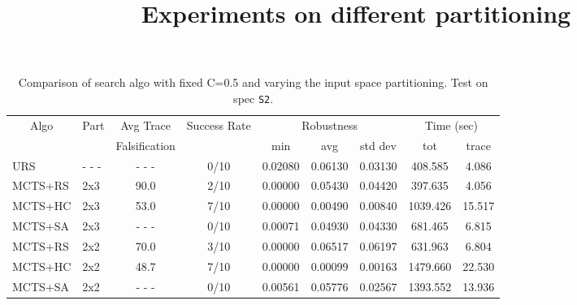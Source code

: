 \documentclass[11pt]{article}
\begin{document}
\begin{table}[ht]
\centering
\title{Experiments on different partitioning}
\begin{tabular}{|l|l|c|c|c|c|c|c|c|}
\hline
\multicolumn{1}{|c|}{\multirow{2}{*}{Algo}} & \multirow{2}{*}{Part} & Avg Trace               & \multirow{2}{*}{Success Rate} & \multicolumn{3}{c|}{Robustness} & \multicolumn{2}{c|}{Time (sec)} \\ \cline{5-9} 
\multicolumn{1}{|c|}{}                      &                    & Falsification           &                               & min      & avg      & std dev  & tot        & trace        \\ \hline
URS                                         & - - -              & - - -                   & 0/10                          & 0.02080  & 0.06130  & 0.03130  &  408.585   &  4.086       \\ \hline
MCTS+RS                                     & 2x3                &  90.0                   & 2/10                          & 0.00000  & 0.05430  & 0.04420  &  397.635   &  4.056       \\
MCTS+HC                                     & 2x3                &  53.0                   & 7/10                          & 0.00000  & 0.00490  & 0.00840  & 1039.426   & 15.517       \\
MCTS+SA                                     & 2x3                & - - -                   & 0/10                          & 0.00071  & 0.04930  & 0.04330  &  681.465   &  6.815       \\ \hline

MCTS+RS                                     & 2x2                &  70.0                   & 3/10                          & 0.00000  & 0.06517  & 0.06197  &  631.963   &  6.804       \\
MCTS+HC                                     & 2x2                &  48.7                   & 7/10                          & 0.00000  & 0.00099  & 0.00163  & 1479.660   & 22.530       \\
MCTS+SA                                     & 2x2                & - - -                   & 0/10                          & 0.00561  & 0.05776  & 0.02567  & 1393.552   & 13.936       \\ \hline
\end{tabular}
\caption{Comparison of search algo with fixed C=0.5 and varying the input space partitioning. Test on spec \texttt{S2}.}~\label{table:patitioning}
\end{table}
\end{document}

